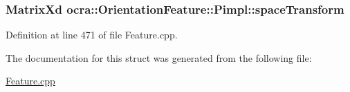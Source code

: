 \subsubsection[{\texorpdfstring{space\+Transform}{spaceTransform}}]{\setlength{\rightskip}{0pt plus 5cm}Matrix\+Xd ocra\+::\+Orientation\+Feature\+::\+Pimpl\+::space\+Transform}\hypertarget{structocra_1_1OrientationFeature_1_1Pimpl_aabbe93797831b01bda2453053e2a1224}{}\label{structocra_1_1OrientationFeature_1_1Pimpl_aabbe93797831b01bda2453053e2a1224}


Definition at line 471 of file Feature.\+cpp.



The documentation for this struct was generated from the following file\+:\begin{DoxyCompactItemize}
\item 
\hyperlink{Feature_8cpp}{Feature.\+cpp}\end{DoxyCompactItemize}
